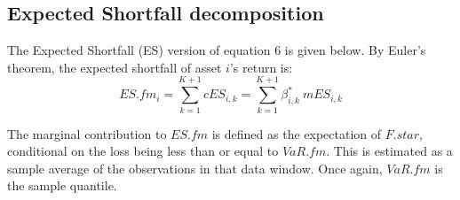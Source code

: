 \documentclass[a4paper]{article}\usepackage[]{graphicx}\usepackage[]{color}
\begin{document}
\subsection{Expected Shortfall decomposition}

The Expected Shortfall (ES) version of equation 6 is given below. By Euler's theorem, the expected shortfall of asset $i$'s return is:
\begin{equation}
ES.fm_i = \sum_{k=1}^{K+1} cES_{i,k} = \sum_{k=1}^{K+1} \beta^*_{i,k} \: mES_{i,k}
\end{equation}

The marginal contribution to $ES.fm$ is defined as the expectation of $F.star$, conditional on the loss being less than or equal to $VaR.fm$. This is estimated as a sample average of the observations in that data window. Once again, $VaR.fm$ is the sample quantile.
\end{document}
